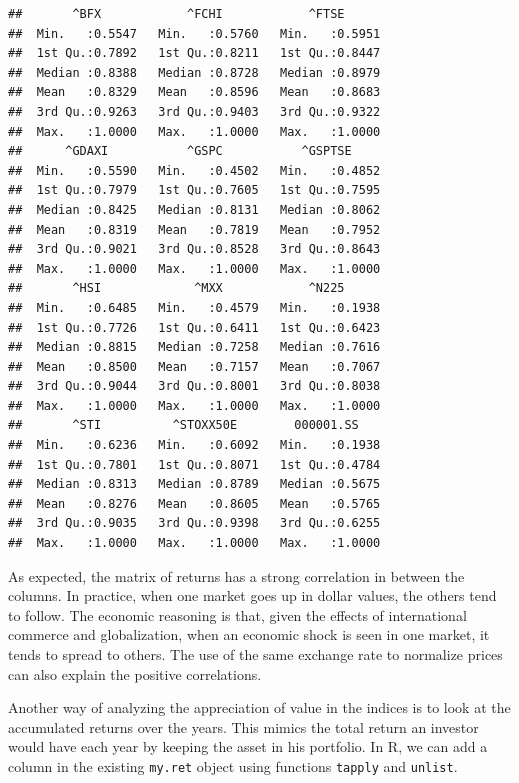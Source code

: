 \documentclass[11pt,]{book}
\begin{document}
\begin{verbatim}
##       ^BFX            ^FCHI            ^FTSE       
##  Min.   :0.5547   Min.   :0.5760   Min.   :0.5951  
##  1st Qu.:0.7892   1st Qu.:0.8211   1st Qu.:0.8447  
##  Median :0.8388   Median :0.8728   Median :0.8979  
##  Mean   :0.8329   Mean   :0.8596   Mean   :0.8683  
##  3rd Qu.:0.9263   3rd Qu.:0.9403   3rd Qu.:0.9322  
##  Max.   :1.0000   Max.   :1.0000   Max.   :1.0000  
##      ^GDAXI           ^GSPC           ^GSPTSE      
##  Min.   :0.5590   Min.   :0.4502   Min.   :0.4852  
##  1st Qu.:0.7979   1st Qu.:0.7605   1st Qu.:0.7595  
##  Median :0.8425   Median :0.8131   Median :0.8062  
##  Mean   :0.8319   Mean   :0.7819   Mean   :0.7952  
##  3rd Qu.:0.9021   3rd Qu.:0.8528   3rd Qu.:0.8643  
##  Max.   :1.0000   Max.   :1.0000   Max.   :1.0000  
##       ^HSI             ^MXX            ^N225       
##  Min.   :0.6485   Min.   :0.4579   Min.   :0.1938  
##  1st Qu.:0.7726   1st Qu.:0.6411   1st Qu.:0.6423  
##  Median :0.8815   Median :0.7258   Median :0.7616  
##  Mean   :0.8500   Mean   :0.7157   Mean   :0.7067  
##  3rd Qu.:0.9044   3rd Qu.:0.8001   3rd Qu.:0.8038  
##  Max.   :1.0000   Max.   :1.0000   Max.   :1.0000  
##       ^STI          ^STOXX50E        000001.SS     
##  Min.   :0.6236   Min.   :0.6092   Min.   :0.1938  
##  1st Qu.:0.7801   1st Qu.:0.8071   1st Qu.:0.4784  
##  Median :0.8313   Median :0.8789   Median :0.5675  
##  Mean   :0.8276   Mean   :0.8605   Mean   :0.5765  
##  3rd Qu.:0.9035   3rd Qu.:0.9398   3rd Qu.:0.6255  
##  Max.   :1.0000   Max.   :1.0000   Max.   :1.0000
\end{verbatim}

As expected, the matrix of returns has a strong correlation in between
the columns. In practice, when one market goes up in dollar values, the
others tend to follow. The economic reasoning is that, given the effects
of international commerce and globalization, when an economic shock is
seen in one market, it tends to spread to others. The use of the same
exchange rate to normalize prices can also explain the positive
correlations.

Another way of analyzing the appreciation of value in the indices is to
look at the accumulated returns over the years. This mimics the total
return an investor would have each year by keeping the asset in his
portfolio. In R, we can add a column in the existing \texttt{my.ret}
object using functions \texttt{tapply} and \texttt{unlist}.
\end{document}
